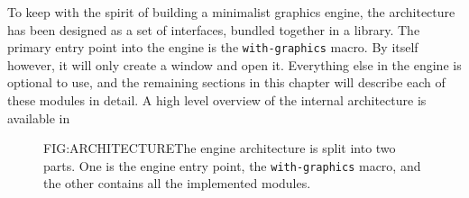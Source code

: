 
\label{SEC:ARCH}

To keep with the spirit of building a minimalist graphics engine,
the architecture has been designed as a set of interfaces,
bundled together in a library.
The primary entry point into the engine is the \texttt{with-graphics} macro.
By itself however,
it will only create a window and open it.
Everything else in the engine is optional to use,
and the remaining sections in this chapter will describe each of these modules in detail.
A high level overview of the internal architecture is available in 

\begin{figure}[High level architecture overview]{FIG:ARCHITECTURE}{The engine architecture is split into two parts. One is the engine entry point, the \texttt{with-graphics} macro, and the other contains all the implemented modules.}

\end{figure}
